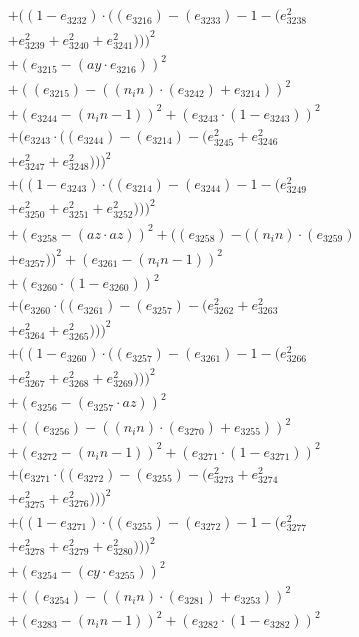\documentclass[10pt, a4paper]{article}
\begin{document}
\begin{small}
\begin{align*}
& + ((1 - e_{3232})  \cdot  ((e_{3216}) - (e_{3233}) - 1 - (e_{3238}^{2} \\
& + e_{3239}^{2} + e_{3240}^{2} + e_{3241}^{2})))^{2} \\
& + (e_{3215} - (ay  \cdot  e_{3216}))^{2} \\
& + ((e_{3215}) - ((n_in)  \cdot  (e_{3242}) + e_{3214}))^{2} \\
& + (e_{3244} - (n_in - 1))^{2} + (e_{3243}  \cdot  (1 - e_{3243}))^{2} \\
& + (e_{3243}  \cdot  ((e_{3244}) - (e_{3214}) - (e_{3245}^{2} + e_{3246}^{2} \\
& + e_{3247}^{2} + e_{3248}^{2})))^{2} \\
& + ((1 - e_{3243})  \cdot  ((e_{3214}) - (e_{3244}) - 1 - (e_{3249}^{2} \\
& + e_{3250}^{2} + e_{3251}^{2} + e_{3252}^{2})))^{2} \\
& + (e_{3258} - (az  \cdot  az))^{2} + ((e_{3258}) - ((n_in)  \cdot  (e_{3259}) \\
& + e_{3257}))^{2} + (e_{3261} - (n_in - 1))^{2} \\
& + (e_{3260}  \cdot  (1 - e_{3260}))^{2} \\
& + (e_{3260}  \cdot  ((e_{3261}) - (e_{3257}) - (e_{3262}^{2} + e_{3263}^{2} \\
& + e_{3264}^{2} + e_{3265}^{2})))^{2} \\
& + ((1 - e_{3260})  \cdot  ((e_{3257}) - (e_{3261}) - 1 - (e_{3266}^{2} \\
& + e_{3267}^{2} + e_{3268}^{2} + e_{3269}^{2})))^{2} \\
& + (e_{3256} - (e_{3257}  \cdot  az))^{2} \\
& + ((e_{3256}) - ((n_in)  \cdot  (e_{3270}) + e_{3255}))^{2} \\
& + (e_{3272} - (n_in - 1))^{2} + (e_{3271}  \cdot  (1 - e_{3271}))^{2} \\
& + (e_{3271}  \cdot  ((e_{3272}) - (e_{3255}) - (e_{3273}^{2} + e_{3274}^{2} \\
& + e_{3275}^{2} + e_{3276}^{2})))^{2} \\
& + ((1 - e_{3271})  \cdot  ((e_{3255}) - (e_{3272}) - 1 - (e_{3277}^{2} \\
& + e_{3278}^{2} + e_{3279}^{2} + e_{3280}^{2})))^{2} \\
& + (e_{3254} - (cy  \cdot  e_{3255}))^{2} \\
& + ((e_{3254}) - ((n_in)  \cdot  (e_{3281}) + e_{3253}))^{2} \\
& + (e_{3283} - (n_in - 1))^{2} + (e_{3282}  \cdot  (1 - e_{3282}))^{2} \\

\end{align*}
\end{small}
\end{document}
